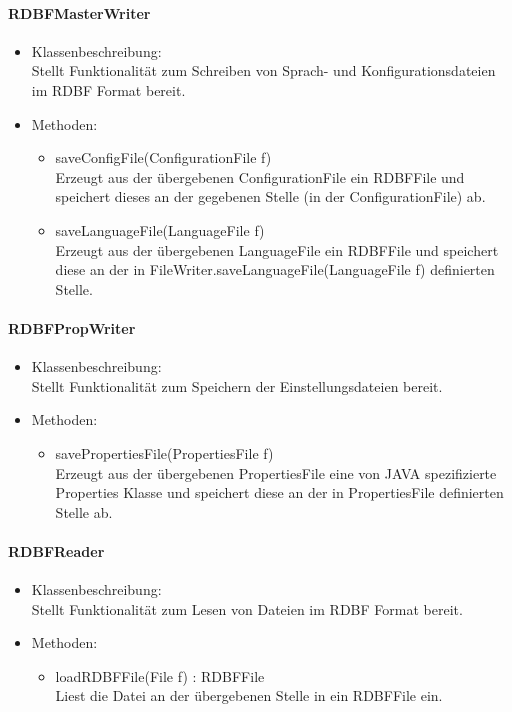 \documentclass[parskip=full]{scrartcl}
\begin{document}
\paragraph{RDBFMasterWriter}
\begin{itemize}
\item Klassenbeschreibung: \\
Stellt Funktionalität zum Schreiben von Sprach- und Konfigurationsdateien im RDBF Format bereit.
\item Methoden: \\
\begin{itemize}
\item saveConfigFile(ConfigurationFile f) \\
Erzeugt aus der übergebenen ConfigurationFile ein RDBFFile und speichert dieses an der gegebenen Stelle (in der ConfigurationFile) ab.
\item saveLanguageFile(LanguageFile f) \\
Erzeugt aus der übergebenen LanguageFile ein RDBFFile und speichert diese an der in FileWriter.saveLanguageFile(LanguageFile f) definierten Stelle.
\end{itemize}
\end{itemize}

\paragraph{RDBFPropWriter}
\begin{itemize}
\item Klassenbeschreibung: \\
Stellt Funktionalität zum Speichern der Einstellungsdateien bereit.
\item Methoden: \\
\begin{itemize}
\item savePropertiesFile(PropertiesFile f) \\
Erzeugt aus der übergebenen PropertiesFile eine von JAVA spezifizierte Properties Klasse und speichert diese an der in PropertiesFile definierten Stelle ab.
\end{itemize}
\end{itemize}

\paragraph{RDBFReader}
\begin{itemize}
\item Klassenbeschreibung: \\
Stellt Funktionalität zum Lesen von Dateien im RDBF Format bereit.
\item Methoden: \\
\begin{itemize}
\item loadRDBFFile(File f) : RDBFFile \\
Liest die Datei an der übergebenen Stelle in ein RDBFFile ein.
\end{itemize}
\end{itemize}
\end{document}
